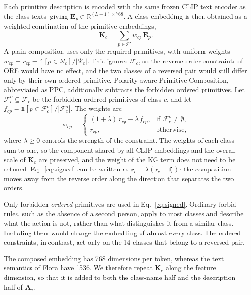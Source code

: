 \documentclass[11pt]{article}
\begin{document}
Each primitive description is encoded with the same frozen CLIP text encoder as the class texts, giving $\mathbf{E}_p \in \mathbb{R}^{(L+1) \times 768}$. A class embedding is then obtained as a weighted combination of the primitive embeddings,
\begin{equation}
  \mathbf{K}_c = \sum_{p \in \mathcal{P}'} w_{cp}\, \mathbf{E}_p .
  \label{eq:compose}
\end{equation}
A plain composition uses only the required primitives, with uniform weights $w_{cp} = r_{cp} = \mathbb{1}[p \in \mathcal{R}_c] / |\mathcal{R}_c|$. This ignores $\mathcal{F}_c$, so the reverse-order constraints of ORE would have no effect, and the two classes of a reversed pair would still differ only by their own ordered primitive. Polarity-aware Primitive Composition, abbreviated as PPC, additionally subtracts the forbidden ordered primitives. Let $\mathcal{F}^{o}_c \subseteq \mathcal{F}_c$ be the forbidden ordered primitives of class $c$, and let $f_{cp} = \mathbb{1}[p \in \mathcal{F}^{o}_c] / |\mathcal{F}^{o}_c|$. The weights are
\begin{equation}
  w_{cp} =
  \begin{cases}
    (1+\lambda)\, r_{cp} - \lambda\, f_{cp}, & \text{if } \mathcal{F}^{o}_c \neq \emptyset, \\
    r_{cp}, & \text{otherwise},
  \end{cases}
  \label{eq:signed}
\end{equation}
where $\lambda \ge 0$ controls the strength of the constraint. The weights of each class sum to one, so the component shared by all CLIP embeddings and the overall scale of $\mathbf{K}_c$ are preserved, and the weight of the KG term does not need to be retuned. Eq.~\eqref{eq:signed} can be written as $\mathbf{r}_c + \lambda(\mathbf{r}_c - \mathbf{f}_c)$: the composition moves away from the reverse order along the direction that separates the two orders.

Only forbidden \emph{ordered} primitives are used in Eq.~\eqref{eq:signed}. Ordinary forbid rules, such as the absence of a second person, apply to most classes and describe what the action is not, rather than what distinguishes it from a similar class. Including them would change the embedding of almost every class. The ordered constraints, in contrast, act only on the 14 classes that belong to a reversed pair.

The composed embedding has 768 dimensions per token, whereas the text semantics of Flora have 1536. We therefore repeat $\mathbf{K}_c$ along the feature dimension, so that it is added to both the class-name half and the description half of $\mathbf{A}_c$.
\end{document}

